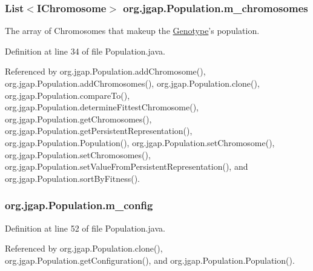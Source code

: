 \hypertarget{classorg_1_1jgap_1_1_population_abc9fbe0eb7dc8ea169782159ca69ad70}{
\subsubsection[{m\-\_\-chromosomes}]{\setlength{\rightskip}{0pt plus 5cm}List$<${\bf I\-Chromosome}$>$ org.\-jgap.\-Population.\-m\-\_\-chromosomes\hspace{0.3cm}{\ttfamily [private]}}}\label{classorg_1_1jgap_1_1_population_abc9fbe0eb7dc8ea169782159ca69ad70}
The array of Chromosomes that makeup the \hyperlink{classorg_1_1jgap_1_1_genotype}{Genotype}'s population. 

Definition at line 34 of file Population.\-java.



Referenced by org.\-jgap.\-Population.\-add\-Chromosome(), org.\-jgap.\-Population.\-add\-Chromosomes(), org.\-jgap.\-Population.\-clone(), org.\-jgap.\-Population.\-compare\-To(), org.\-jgap.\-Population.\-determine\-Fittest\-Chromosome(), org.\-jgap.\-Population.\-get\-Chromosomes(), org.\-jgap.\-Population.\-get\-Persistent\-Representation(), org.\-jgap.\-Population.\-Population(), org.\-jgap.\-Population.\-set\-Chromosome(), org.\-jgap.\-Population.\-set\-Chromosomes(), org.\-jgap.\-Population.\-set\-Value\-From\-Persistent\-Representation(), and org.\-jgap.\-Population.\-sort\-By\-Fitness().

\hypertarget{classorg_1_1jgap_1_1_population_a84643e202f73135b3fc3a31b19ed29e2}{
\subsubsection[{m\-\_\-config}]{ org.\-jgap.\-Population.\-m\-\_\-config\hspace{0.3cm}{\ttfamily [private]}}}\label{classorg_1_1jgap_1_1_population_a84643e202f73135b3fc3a31b19ed29e2}


Definition at line 52 of file Population.\-java.



Referenced by org.\-jgap.\-Population.\-clone(), org.\-jgap.\-Population.\-get\-Configuration(), and org.\-jgap.\-Population.\-Population().

